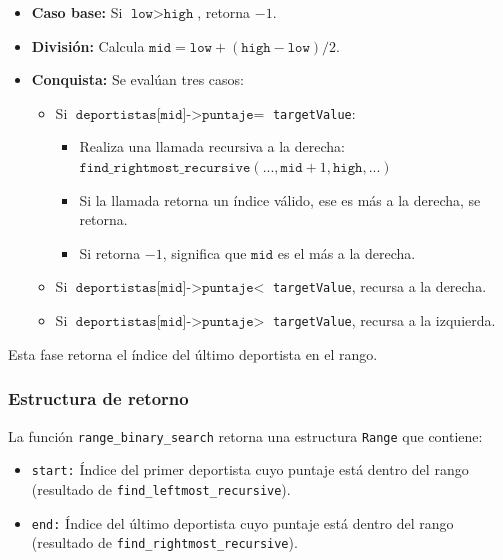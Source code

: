 \begin{itemize}
    \item \textbf{Caso base:} Si \(\texttt{low} > \texttt{high}\), retorna $-1$.
    
    \item \textbf{División:} Calcula \(\texttt{mid} = \texttt{low} + (\texttt{high} - \texttt{low}) / 2\).
    
    \item \textbf{Conquista:} Se evalúan tres casos:
    \begin{itemize}
        \item Si \(\texttt{deportistas[mid]->puntaje} =\) \texttt{targetValue}:
        \begin{itemize}
            \item Realiza una llamada recursiva a la derecha: \(\texttt{find\_rightmost\_recursive}(\text{...}, \texttt{mid} + 1, \texttt{high}, \text{...})\)
            \item Si la llamada retorna un índice válido, ese es más a la derecha, se retorna.
            \item Si retorna $-1$, significa que \(\texttt{mid}\) es el más a la derecha.
        \end{itemize}
        \item Si \(\texttt{deportistas[mid]->puntaje} <\) \texttt{targetValue}, recursa a la derecha.
        \item Si \(\texttt{deportistas[mid]->puntaje} >\) \texttt{targetValue}, recursa a la izquierda.
    \end{itemize}
\end{itemize}

Esta fase retorna el índice del último deportista en el rango.

\subsubsection{Estructura de retorno}

La función \texttt{range\_binary\_search} retorna una estructura \texttt{Range} que contiene:

\begin{itemize}
    \item \texttt{start:} Índice del primer deportista cuyo puntaje está dentro del rango (resultado de \texttt{find\_leftmost\_recursive}).
    \item \texttt{end:} Índice del último deportista cuyo puntaje está dentro del rango (resultado de \texttt{find\_rightmost\_recursive}).
\end{itemize}

